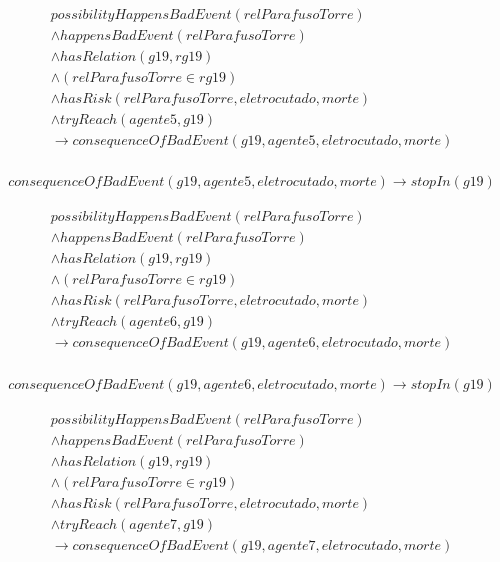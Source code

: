 \begin{eqnarray}\nonumber
    possibilityHappensBadEvent(relParafusoTorre) \nonumber \\
    \wedge happensBadEvent(relParafusoTorre) \nonumber \\ 
    \wedge hasRelation(g19,rg19)  \nonumber \\  
    \wedge (relParafusoTorre \in rg19) \nonumber \\ 
    \wedge hasRisk(relParafusoTorre,eletrocutado,morte) \nonumber \\  
    \wedge tryReach(agente5,g19) \nonumber \\ 
    \to consequenceOfBadEvent(g19,agente5,eletrocutado,morte) \\ \nonumber
\end{eqnarray}

\begin{eqnarray}
	consequenceOfBadEvent(g19,agente5,eletrocutado,morte) \to stopIn(g19)
\end{eqnarray}

\begin{eqnarray}\nonumber
   possibilityHappensBadEvent(relParafusoTorre) \nonumber \\
    \wedge happensBadEvent(relParafusoTorre) \nonumber \\ 
    \wedge hasRelation(g19,rg19)  \nonumber \\  
    \wedge (relParafusoTorre \in rg19) \nonumber \\ 
    \wedge hasRisk(relParafusoTorre,eletrocutado,morte) \nonumber \\  
    \wedge tryReach(agente6,g19) \nonumber \\ 
    \to consequenceOfBadEvent(g19,agente6,eletrocutado,morte) \\ \nonumber
\end{eqnarray}

\begin{eqnarray}
	consequenceOfBadEvent(g19,agente6,eletrocutado,morte) \to stopIn(g19)
\end{eqnarray}

\begin{eqnarray}\nonumber
   possibilityHappensBadEvent(relParafusoTorre) \nonumber \\
    \wedge happensBadEvent(relParafusoTorre) \nonumber \\ 
    \wedge hasRelation(g19,rg19)  \nonumber \\  
    \wedge (relParafusoTorre \in rg19) \nonumber \\ 
    \wedge hasRisk(relParafusoTorre,eletrocutado,morte) \nonumber \\  
    \wedge tryReach(agente7,g19) \nonumber \\ 
    \to consequenceOfBadEvent(g19,agente7,eletrocutado,morte) \\ \nonumber
\end{eqnarray}

